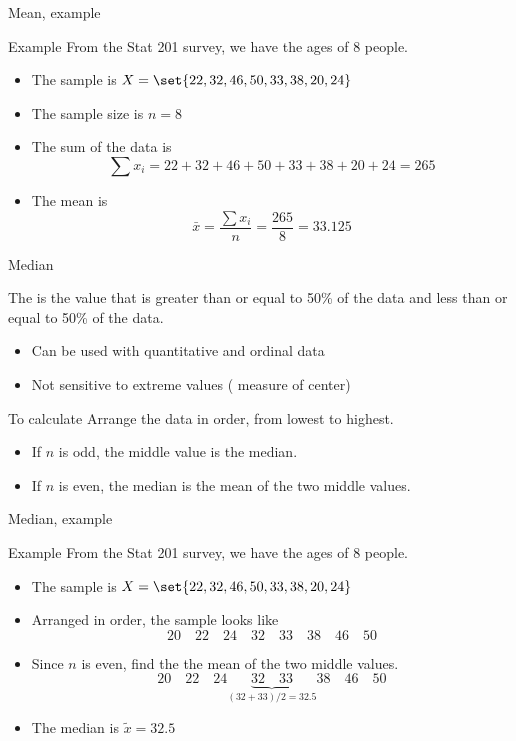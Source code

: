 \documentclass[xcolor=table, handout]{beamer}
\begin{document}
\begin{frame}{Mean, example}
\begin{exampleblock}{Example}
From the Stat 201 survey, we have the ages of 8 people.

\begin{itemize}
\item The sample is $X = \set{22, 32, 46, 50, 33, 38, 20, 24}$
\item The sample size is $n=8$
\pause
\item The sum of the data is
\[\sum x_i = 22 + 32 + 46 + 50 + 33 +  38 + 20 + 24 = 265\]
\pause
\item The mean is
\[\bar x = \frac {\sum x_i}{n} = \frac {265} 8 = 33.125\]
\end{itemize}
\smallskip
\end{exampleblock}
\end{frame}

\begin{frame}{Median}
\begin{block}{}
The  is the value that is greater than or equal to 50\% of the data and less than or equal to 50\% of the data.
\begin{itemize}
\item Can be used with quantitative and ordinal data
\item Not sensitive to extreme values ( measure of center)
\end{itemize}
\end{block}

\pause
\begin{exampleblock}{To calculate}
Arrange the data in order, from lowest to highest.
\begin{itemize}
\item If $n$ is odd, the middle value is the median.
\item If $n$ is even, the median is the mean of the two middle values.
\end{itemize}
\end{exampleblock}
\end{frame}

\begin{frame}{Median, example}
\begin{exampleblock}{Example}
From the Stat 201 survey, we have the ages of 8 people.

\begin{itemize}
\item The sample is $X = \set{22, 32, 46, 50, 33, 38, 20, 24}$
\pause
\item Arranged in order, the sample looks like
\[20 \quad 22 \quad 24 \quad 32 \quad 33 \quad 38 \quad 46 \quad 50 \]
\pause
\item Since $n$ is even, find the the mean of the two middle values.
\[20 \quad 22 \quad 24  \underbrace{32 \quad 33}_{(32+33)/2 = 32.5}  38 \quad 46 \quad 50 \]
\pause
\item The median is $\tilde x = 32.5$
\end{itemize}
\smallskip
\end{exampleblock}

\end{frame}
\end{document}

